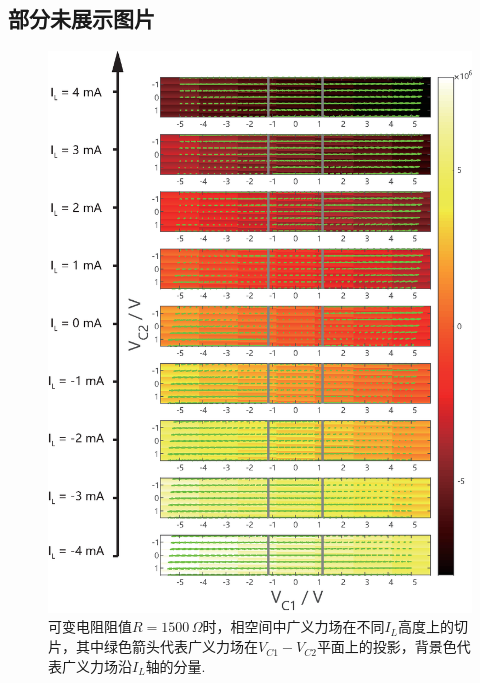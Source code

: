 \documentclass[a4paper, 10pt]{article}
\begin{document}
\begin{appendix}
\section{部分未展示图片}
\begin{figure}[H]
    \centering
    \includegraphics[width=.9\columnwidth]{Generalized-force-map-R=1500-modified.eps}
    \caption{可变电阻阻值$R=1500\,\Omega$时，相空间中广义力场在不同$I_L$高度上的切片，其中绿色箭头代表广义力场在$V_{C1}-V_{C2}$平面上的投影，背景色代表广义力场沿$I_L$轴的分量.}
    \label{Generalized-force-map-R=1500}
\end{figure}


\end{appendix}
\end{document}
